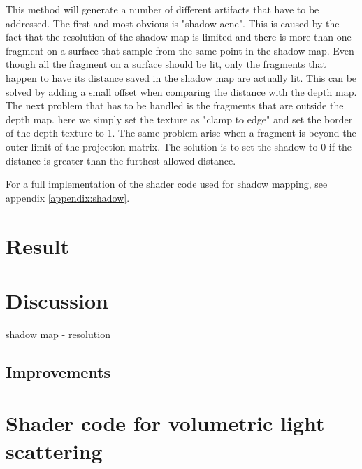 \documentclass{article}
\begin{document}
  				This method will generate a number of different artifacts that have to be addressed. The first and most obvious is "shadow acne". This is caused by the fact that the resolution of the shadow map is limited and there is more than one fragment on a surface that sample from the same point in the shadow map. Even though all the fragment on a surface should be lit, only the fragments that happen to have its distance saved in the shadow map are actually lit. This can be solved by adding a small offset when comparing the distance with the depth map. \\
  				
  				The next problem that has to be handled is the fragments that are outside the depth map. here we simply set the texture as "clamp to edge" and set the border of the depth texture to 1. The same problem arise when a fragment is beyond the outer limit of the projection matrix. The solution is to set the shadow to 0 if the distance is greater than the furthest allowed distance.
  				
  				For a full implementation of the shader code used for shadow mapping, see appendix \ref{appendix:shadow}.
  				
  	\section{Result}
  		
  	\section{Discussion}
  	
  	
  	
  	
  	
  	
  	
  	
  		shadow map - resolution
  		
  	\subsection{Improvements}

	\newpage
	
	{}
	
	\newpage
	\appendix
	\section{Shader code for volumetric light scattering}
	\label{appendix:godray}
		
\end{document}
